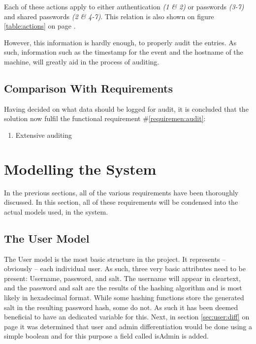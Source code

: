 		Each of these actions apply to either authentication \emph{(1 \& 2)} or passwords \emph{(3-7)} and shared passwords \emph{(2 \& 4-7)}. This relation is also shown on figure \ref{table:actions} on page \pageref{table:actions}.
		
		However, this information is hardly enough, to properly audit the entries. As such, information such as the timestamp for the event and the hostname of the machine, will greatly aid in the process of auditing. 

		\subsection{Comparison With Requirements}
			\label{requirement:fulfilled:audit}
			Having decided on what data should be logged for audit, it is concluded that the solution now fulfil the functional requirement \#\ref{requiremen:audit}:
			\vspace{-3ex}\begin{enumerate}
				\setlength\itemsep{0.1em}
				\setcounter{enumi}{13-1}
				\item Extensive auditing
			\end{enumerate}

	\section{Modelling the System}
		\label{sec:modelling}
		In the previous sections, all of the various requirements have been thoroughly discussed. In this section, all of these requirements will be condensed into the actual models used, in the system. 

		\subsection{The User Model}
			The User model is the most basic structure in the project. It represents -- obviously -- each individual user. As such, three very basic attributes need to be present: Username, password, and salt. The username will appear in cleartext, and the password and salt are the results of the hashing algorithm and is most likely in hexadecimal format. While some hashing functions store the generated salt in the resulting password hash, some do not. As such it has been deemed beneficial to have an dedicated variable for this. Next, in section \ref{sec:user:diff} on page \pageref{sec:user:diff} it was determined that user and admin differentiation would be done using a simple boolean and for this purpose a field called isAdmin is added.

